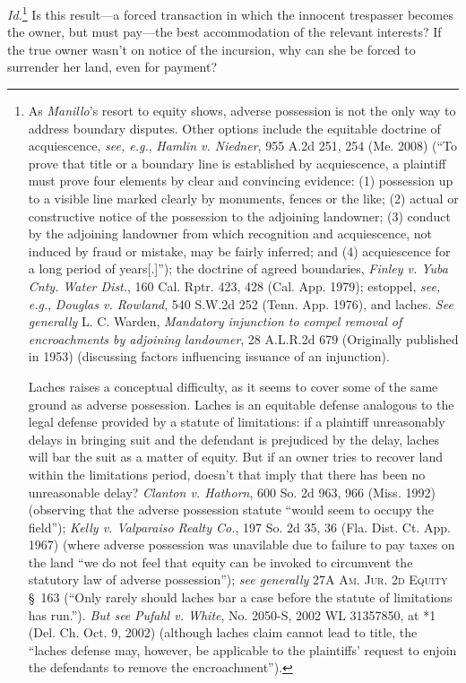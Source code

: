 \textit{Id.}\footnote{As \textit{Manillo}'s resort to equity shows, adverse
possession is not the only way to address boundary disputes. Other options
include the equitable doctrine of acquiescence, \textit{see, e.g.}, \emph{Hamlin
v. Niedner}, 955 A.2d 251, 254 (Me. 2008) (``To prove that title or a boundary
line
is established by acquiescence, a plaintiff must prove four elements by clear
and convincing evidence: (1) possession up to a visible line marked clearly by
monuments, fences or the like; (2) actual or constructive notice of the
possession to the adjoining landowner; (3) conduct by the adjoining landowner
from which recognition and acquiescence, not induced by fraud or mistake, may
be fairly inferred; and (4) acquiescence for a long period of years[.]''); the
doctrine of agreed boundaries, \emph{Finley v. Yuba Cnty. Water Dist.}, 160 Cal. Rptr.
423, 428 (Cal. App. 1979); estoppel, \textit{see, e.g.}, \emph{Douglas v. Rowland},
540 S.W.2d 252 (Tenn. App. 1976), and laches. \textit{See generally} L. C.
Warden, \textit{Mandatory injunction to compel removal of encroachments by
adjoining landowner}, 28 A.L.R.2d 679 (Originally published in 1953)
(discussing factors influencing issuance of an injunction).\par Laches raises a
conceptual difficulty, as it seems to cover some of the same ground as adverse
possession. Laches is an equitable defense analogous to the legal defense
provided by a statute of limitations: if a plaintiff unreasonably delays in
bringing suit and the defendant is prejudiced by the delay, laches will bar the
suit as a matter of equity. But if an owner tries to recover land within the
limitations period, doesn't that imply that there has been no unreasonable
delay? \emph{Clanton v. Hathorn}, 600 So. 2d 963, 966 (Miss. 1992) (observing that the
adverse possession statute ``would seem to occupy the field''); \emph{Kelly v.
Valparaiso Realty Co.}, 197 So. 2d 35, 36 (Fla. Dist. Ct. App. 1967) (where
adverse possession was unavilable due to failure to pay taxes on the land ``we
do not feel that equity can be invoked to circumvent the statutory law of
adverse possession''); \textit{see generally} 27A \textsc{Am. Jur. 2d Equity}
\S~163
(``Only rarely should laches bar a case before the statute of limitations has
run.''). \textit{But see} \emph{Pufahl v. White}, No. 2050-S, 2002 WL 31357850,
at *1
(Del. Ch. Oct. 9, 2002) (although laches claim cannot lead to title, the
``laches defense may, however, be applicable to the plaintiffs' request to
enjoin the defendants to remove the encroachment'').} Is this result---a forced
transaction in which the innocent trespasser becomes the owner, but must
pay---the best accommodation of the relevant interests? If the true owner
wasn't on notice of the incursion, why can she be forced to surrender her land,
even for payment?  

